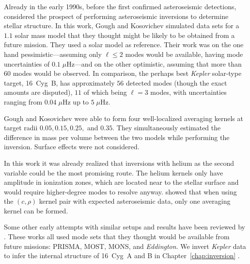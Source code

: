 Already in the early 1990s, before the first confirmed asteroseismic detections, \citet{1993ASPC...40..541G} considered the prospect of performing asteroseismic inversions to determine stellar structure. 
In this work, Gough and Kosovichev simulated data sets for a $1.1$ solar mass model that they thought might be likely to be obtained from a future mission. %
They used a solar model as reference. 
Their work was on the one hand pessimistic---assuming only ${\ell\leq 2}$ modes would be available, having mode uncertainties of ${0.1\;\mu\text{Hz}}$---and on the other optimistic, assuming that more than $60$ modes would be observed. 
In comparison, the perhaps best \emph{Kepler} solar-type target, 16~Cyg~B, has approximately $56$ detected modes (though the exact amounts are disputed), $11$ of which being ${\ell=3}$ modes, with uncertainties ranging from ${0.04\;\mu\text{Hz}}$ up to ${5\;\mu\text{Hz}}$. 

Gough and Kosovichev were able to form four well-localized averaging kernels at target radii $0.05, 0.15, 0.25,$ and $0.35$. 
They simultaneously estimated the difference in mass per volume between the two models while performing the inversion. 
Surface effects were not considered. 

In this work it was already realized that inversions with helium as the second variable could be the most promising route. 
The helium kernels only have amplitude in ionization zones, which are located near to the stellar surface and would require higher-degree modes to resolve anyway. 
\citet{2001ESASP.464..407B} showed that when using the ${(c,\rho)}$ kernel pair with expected asteroseismic data, only one averaging kernel can be formed. 

Some other early attempts with similar setups and results have been reviewed by \citet{2003Ap&SS.284..153B}. 
These works all used mode sets that they thought would be available from future missions: PRISMA, MOST, MONS, and \emph{Eddington}. %
\lr{Unfortunately, PRISMA, MONS, and \emph{Eddington} were not funded, and MOST did not detect any oscillations in solar-like stars. %
It is only now with the CoRoT and \emph{Kepler} missions that the data are good enough to measure internal stellar structure.} 
We invert \emph{Kepler} data to infer the internal structure of 16~Cyg~A and B in Chapter~\ref{chap:inversion} \citep{2017ApJ...851...80B}. 

